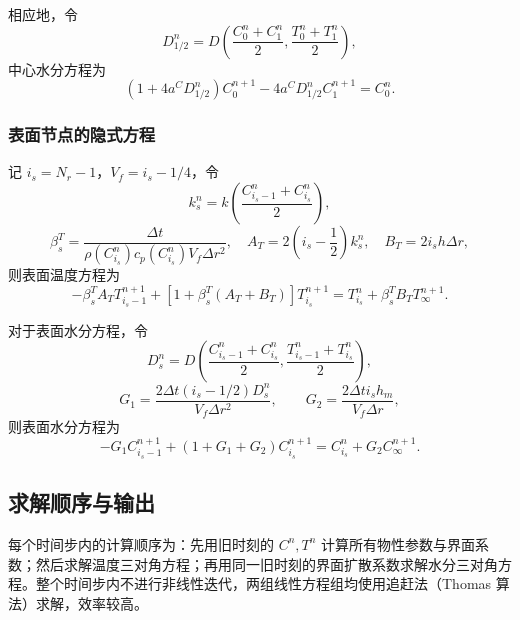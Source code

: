 \documentclass[withoutpreface,bwprint]{cumcm_thesis}
\begin{document}
相应地，令
\begin{equation}
D_{1/2}^n = D\left(\frac{C_0^n + C_1^n}{2}, \frac{T_0^n + T_1^n}{2}\right),
\end{equation}
中心水分方程为
\begin{equation}
\left(1 + 4a^C D_{1/2}^n\right)C_0^{n+1} - 4a^C D_{1/2}^n C_1^{n+1} = C_0^n.
\end{equation}

\subsubsection{表面节点的隐式方程}

记 \(i_s = N_r-1\)，\(V_f = i_s - 1/4\)，令
\begin{equation}
k_s^n = k\left(\frac{C_{i_s-1}^n + C_{i_s}^n}{2}\right),
\end{equation}
\begin{equation}
\beta_s^T = \frac{\Delta t}{\rho(C_{i_s}^n)c_p(C_{i_s}^n)V_f \Delta r^2}, \quad A_T = 2\left(i_s - \frac{1}{2}\right)k_s^n, \quad B_T = 2i_s h \Delta r,
\end{equation}
则表面温度方程为
\begin{equation}
-\beta_s^T A_T T_{i_s-1}^{n+1} + \left[1 + \beta_s^T(A_T + B_T)\right]T_{i_s}^{n+1} = T_{i_s}^n + \beta_s^T B_T T_\infty^{n+1}.
\end{equation}

对于表面水分方程，令
\begin{equation}
D_s^n = D\left(\frac{C_{i_s-1}^n + C_{i_s}^n}{2}, \frac{T_{i_s-1}^n + T_{i_s}^n}{2}\right),
\end{equation}
\begin{equation}
G_1 = \frac{2\Delta t(i_s - 1/2)D_s^n}{V_f \Delta r^2}, \qquad G_2 = \frac{2\Delta t i_s h_m}{V_f \Delta r},
\end{equation}
则表面水分方程为
\begin{equation}
-G_1 C_{i_s-1}^{n+1} + (1 + G_1 + G_2)C_{i_s}^{n+1} = C_{i_s}^n + G_2 C_\infty^{n+1}.
\end{equation}

\subsection{求解顺序与输出}

每个时间步内的计算顺序为：先用旧时刻的 \(C^n, T^n\) 计算所有物性参数与界面系数；然后求解温度三对角方程；再用同一旧时刻的界面扩散系数求解水分三对角方程。整个时间步内不进行非线性迭代，两组线性方程组均使用追赶法（Thomas 算法）求解，效率较高。
\end{document}
